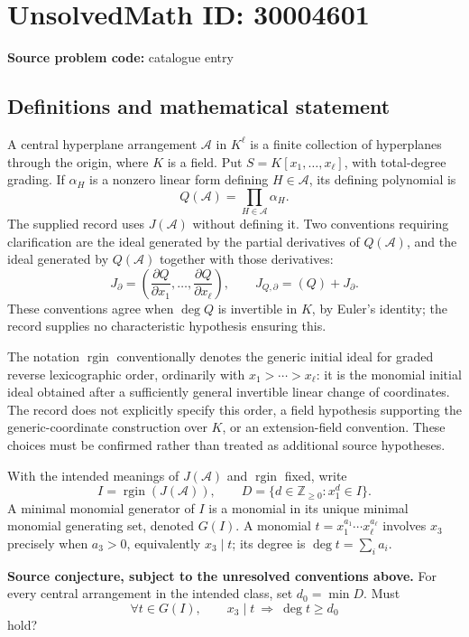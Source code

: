 \documentclass[11pt]{article}
\begin{document}
\section*{UnsolvedMath ID: 30004601}
\textbf{Source problem code:} catalogue entry
\subsection{Definitions and mathematical statement}
A central hyperplane arrangement \(\mathcal A\) in \(K^\ell\) is a finite collection of hyperplanes through the origin, where \(K\) is a field. Put \(S=K[x_1,\ldots,x_\ell]\), with total-degree grading. If \(\alpha_H\) is a nonzero linear form defining \(H\in\mathcal A\), its defining polynomial is
\[
Q(\mathcal A)=\prod_{H\in\mathcal A}\alpha_H.
\]
The supplied record uses \(J(\mathcal A)\) without defining it. Two conventions requiring clarification are the ideal generated by the partial derivatives of \(Q(\mathcal A)\), and the ideal generated by \(Q(\mathcal A)\) together with those derivatives:
\[
J_{\partial}=\left(\frac{\partial Q}{\partial x_1},\ldots,\frac{\partial Q}{\partial x_\ell}\right),\qquad
J_{Q,\partial}=(Q)+J_{\partial}.
\]
These conventions agree when \(\deg Q\) is invertible in \(K\), by Euler's identity; the record supplies no characteristic hypothesis ensuring this.

The notation \(\operatorname{rgin}\) conventionally denotes the generic initial ideal for graded reverse lexicographic order, ordinarily with \(x_1>\cdots>x_\ell\): it is the monomial initial ideal obtained after a sufficiently general invertible linear change of coordinates. The record does not explicitly specify this order, a field hypothesis supporting the generic-coordinate construction over \(K\), or an extension-field convention. These choices must be confirmed rather than treated as additional source hypotheses.

With the intended meanings of \(J(\mathcal A)\) and \(\operatorname{rgin}\) fixed, write
\[
I=\operatorname{rgin}(J(\mathcal A)),\qquad
D=\{d\in\mathbb Z_{\geq 0}:x_1^d\in I\}.
\]
A minimal monomial generator of \(I\) is a monomial in its unique minimal monomial generating set, denoted \(G(I)\). A monomial \(t=x_1^{a_1}\cdots x_\ell^{a_\ell}\) involves \(x_3\) precisely when \(a_3>0\), equivalently \(x_3\mid t\); its degree is \(\deg t=\sum_i a_i\).

\textbf{Source conjecture, subject to the unresolved conventions above.} For every central arrangement in the intended class, set \(d_0=\min D\). Must
\[
\forall t\in G(I),\qquad x_3\mid t\ \Longrightarrow\ \deg t\geq d_0
\]
hold?
\end{document}
